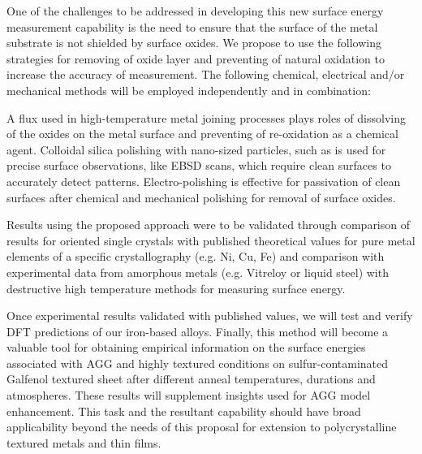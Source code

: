 One of the challenges to be addressed in developing this new surface energy measurement capability is the need to ensure that the surface of the metal substrate is not shielded by surface oxides. We propose to use the following strategies for removing of oxide layer and preventing of natural oxidation to increase the accuracy of measurement. The following chemical, electrical and/or mechanical methods will be employed independently and in combination:
\begin{outline}
	\1 A flux used in high-temperature metal joining processes plays roles of dissolving of the oxides on the metal surface and preventing of re-oxidation as a chemical agent.
	\1 Colloidal silica polishing with nano-sized particles, such as is used for precise surface observations, like EBSD scans, which require clean surfaces to accurately detect patterns.
	\1 Electro-polishing is effective for passivation of clean surfaces after chemical and mechanical polishing for removal of surface oxides. 
\end{outline}
Results using the proposed approach were to be validated through comparison of results for oriented single crystals with published theoretical values for pure metal elements of a specific crystallography (e.g. Ni, Cu, Fe)  and comparison with experimental data from amorphous metals (e.g. Vitreloy or liquid steel) with destructive high temperature methods for measuring surface energy. 

Once experimental results validated with published values, we will test and verify DFT predictions of our iron-based alloys. Finally, this method will become a valuable tool for obtaining empirical information on the surface energies associated with AGG and highly textured conditions on sulfur-contaminated Galfenol textured sheet after different anneal temperatures, durations and atmospheres. These results will supplement insights used for AGG model enhancement. This task and the resultant capability should have broad applicability beyond the needs of this proposal for extension to polycrystalline textured metals and thin films.




